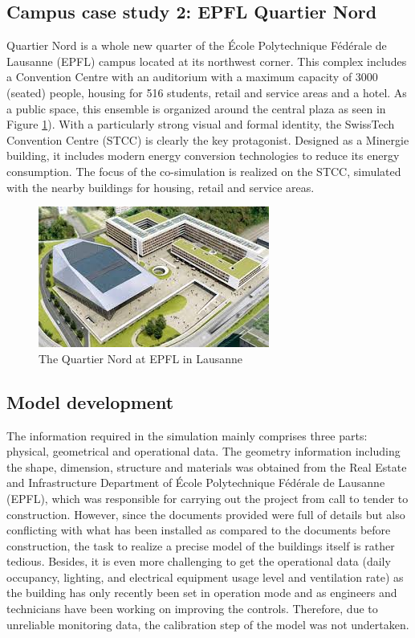 \documentclass{tBPS2e}
\theoremstyle{plain}
\theoremstyle{definition}
\theoremstyle{remark}
\begin{document}
\subsection{Campus case study 2: EPFL Quartier Nord} 
Quartier Nord is a whole new quarter of the École Polytechnique Fédérale de
Lausanne (EPFL) campus located at its northwest corner. This complex includes
a Convention Centre with an auditorium with a maximum capacity of 3000
(seated) people, housing for 516 students, retail and service areas and a
hotel. As a public space, this ensemble is organized around the central plaza as
seen in Figure \ref{fig:quartier_nord_1}). With a particularly strong visual and formal identity, the SwissTech
Convention Centre (STCC) is clearly the key protagonist.  Designed as a
Minergie building, it includes modern energy conversion
technologies to reduce its energy consumption. The focus of the co-simulation
is realized on the STCC, simulated with the nearby buildings for housing,
retail and service areas.

\begin{figure}[H]
\centering
\includegraphics[]{figures/quartier_nord_1}
\caption{The Quartier Nord at EPFL in Lausanne}
\label{fig:quartier_nord_1}
\end{figure}

\subsection{Model development}
The information required in the simulation mainly comprises three parts:
physical, geometrical and operational data. The geometry information including
the shape, dimension, structure and materials was obtained from the Real
Estate and Infrastructure Department of École Polytechnique Fédérale de
Lausanne (EPFL), which was responsible for carrying out the project from call
to tender to construction. However, since the documents provided were full of
details but also conflicting with what has been installed as compared to the
documents before construction, the task to realize a precise model of the
buildings itself is rather tedious. Besides, it is even more challenging to
get the operational data (daily occupancy, lighting, and electrical equipment
usage level and ventilation rate) as the building has only recently been set
in operation mode and as engineers and technicians have been working on
improving the controls. Therefore, due to unreliable monitoring data, the
calibration step of the model was not undertaken.\\
\end{document}
